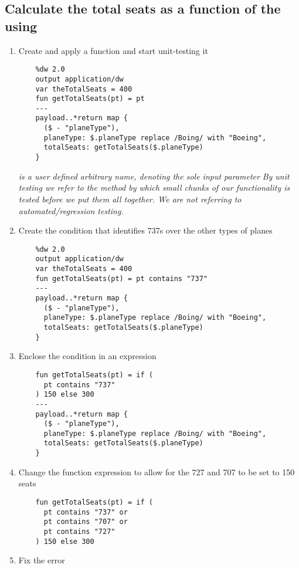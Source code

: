 \subsection{Calculate the total seats as a function of the  using }
\begin{enumerate}[resume*]
\item Create and apply a function and start unit-testing it
  \begin{lstlisting}
    %dw 2.0
    output application/dw
    var theTotalSeats = 400
    fun getTotalSeats(pt) = pt
    ---
    payload..*return map {
      ($ - "planeType"),
      planeType: $.planeType replace /Boing/ with "Boeing",
      totalSeats: getTotalSeats($.planeType)
    }
  \end{lstlisting}
  \emph{
     is a user defined arbitrary name, denoting the sole input parameter
  }
  \newline
  \emph{
    By unit testing we refer to the method by which small chunks of our functionality is tested before we put them all together.  We are not referring to automated/regression testing.
  }
\item Create the condition that identifies 737s over the other types of planes
  \begin{lstlisting}
    %dw 2.0
    output application/dw
    var theTotalSeats = 400
    fun getTotalSeats(pt) = pt contains "737"
    ---
    payload..*return map {
      ($ - "planeType"),
      planeType: $.planeType replace /Boing/ with "Boeing",
      totalSeats: getTotalSeats($.planeType)
    }
  \end{lstlisting}
\item Enclose the condition in an  expression
  \begin{lstlisting}
    fun getTotalSeats(pt) = if (
      pt contains "737"
    ) 150 else 300
    ---
    payload..*return map {
      ($ - "planeType"),
      planeType: $.planeType replace /Boing/ with "Boeing",
      totalSeats: getTotalSeats($.planeType)
    }
  \end{lstlisting}
\item Change the function expression to allow for the 727 and 707 to be set to 150 seats
  \begin{lstlisting}
    fun getTotalSeats(pt) = if (
      pt contains "737" or
      pt contains "707" or
      pt contains "727"
    ) 150 else 300
  \end{lstlisting}
\item Fix the error 

\end{enumerate}
